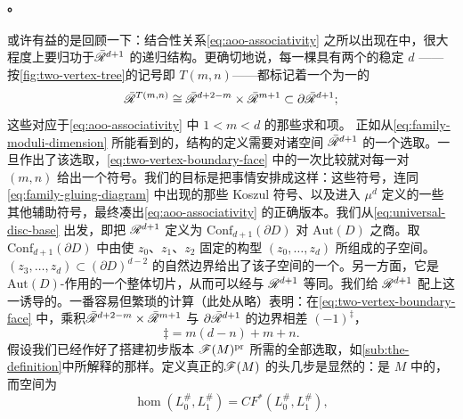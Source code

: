 \paragraph{\trFukayaCategory。}\label{sub:the-fukaya-category}
或许有益的是回顾一下：\trAinfty{}结合性关系\eqref{eq:aoo-associativity} 之所以出现在\trFukayaCategory{}中，很大程度上要归功于\trDeligneMumfordStasheff{}\trCompactification{}$\bar{\mathscr{R}}^{d+1}$ 的递归结构。更确切地说，每一棵具有两个\trVertex{}的稳定 $d$ \trLeafedTree{}——按\cref{fig:two-vertex-tree}的记号即 $T(m,n)$——都标记着一个\trCodimension{}为一的\trBoundaryFace
\begin{equation}\label{eq:two-vertex-boundary-face}
\bar{\mathscr{R}}^{T(m,n)}\cong\bar{\mathscr{R}}^{d+2-m}\times\bar{\mathscr{R}}^{m+1}\subset\partial\bar{\mathscr{R}}^{d+1};
\end{equation}
这些\trBoundaryFace{}对应于\eqref{eq:aoo-associativity} 中 $1<m<d$ 的那些求和项。
正如从\eqref{eq:family-moduli-dimension} 所能看到的，\trAinfty{}结构的定义需要对诸空间 $\bar{\mathscr{R}}^{d+1}$ 的一个\trOrientation{}选取。一旦作出了该选取，\eqref{eq:two-vertex-boundary-face} 中的一次\trOrientation{}比较就对每一对 $(m,n)$ 给出一个符号。我们的目标是把事情安排成这样：这些符号，连同\eqref{eq:family-gluing-diagram} 中出现的那些 Koszul 符号、以及进入 $\mu^d$ 定义的一些其他辅助符号，最终凑出\eqref{eq:aoo-associativity} 的正确版本。我们从\eqref{eq:universal-disc-base} 出发，即把 $\mathscr{R}^{d+1}$ 定义为 $\mathrm{Conf}_{d+1}(\partial D)$ 对 $\mathrm{Aut}(D)$ 之商。取 $\mathrm{Conf}_{d+1}(\partial D)$ 中由使 $z_0$、$z_1$、$z_2$ 固定的构型 $(z_0,\ldots,z_d)$ 所组成的子空间。$(z_3,\ldots,z_d)\subset(\partial D)^{d-2}$ 的自然边界\trOrientation{}给出了该子空间的一个\trOrientation。另一方面，它是 $\mathrm{Aut}(D)$-作用的一个整体切片，从而可以经\trProjection{}与 $\mathscr{R}^{d+1}$ 等同。我们给 $\mathscr{R}^{d+1}$ 配上这一诱导的\trOrientation。一番容易但繁琐的计算（此处从略）表明：在\eqref{eq:two-vertex-boundary-face} 中，乘积\trOrientation{}$\bar{\mathscr{R}}^{d+2-m}\times\bar{\mathscr{R}}^{m+1}$ 与 $\partial\bar{\mathscr{R}}^{d+1}$ 的边界\trOrientation{}相差 $(-1)^{\ddagger}$，
\begin{equation}\label{eq:product-orientation-exponent}
\ddagger=m(d-n)+m+n.
\end{equation}
假设我们已经作好了搭建初步版本 $\mathscr{F}(M)^{\mathrm{pr}}$ 所需的全部选取，如\cref{sub:the-definition}中所解释的那样。定义真正的\trFukayaCategory{}$\mathscr{F}(M)$ 的头几步是显然的：\trObject{}是 $M$ 中的\trExactLagrangianBrane，而\trMorphism{}空间为
\begin{equation*}
\hom(L_0^{\#},L_1^{\#})=CF^*(L_0^{\#},L_1^{\#}),
\end{equation*}
